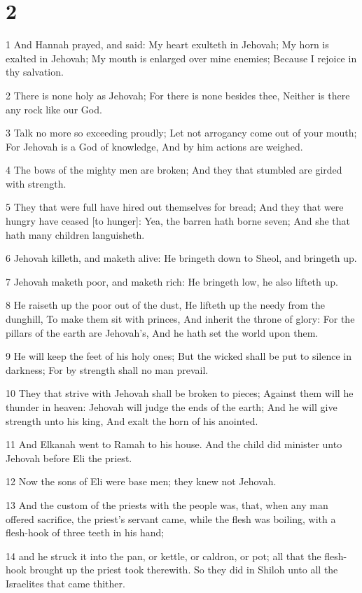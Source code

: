 \chapter{2}

\par 1 And Hannah prayed, and said: My heart exulteth in Jehovah; My horn is exalted in Jehovah; My mouth is enlarged over mine enemies; Because I rejoice in thy salvation.
\par 2 There is none holy as Jehovah; For there is none besides thee, Neither is there any rock like our God.
\par 3 Talk no more so exceeding proudly; Let not arrogancy come out of your mouth; For Jehovah is a God of knowledge, And by him actions are weighed.
\par 4 The bows of the mighty men are broken; And they that stumbled are girded with strength.
\par 5 They that were full have hired out themselves for bread; And they that were hungry have ceased [to hunger]: Yea, the barren hath borne seven; And she that hath many children languisheth.
\par 6 Jehovah killeth, and maketh alive: He bringeth down to Sheol, and bringeth up.
\par 7 Jehovah maketh poor, and maketh rich: He bringeth low, he also lifteth up.
\par 8 He raiseth up the poor out of the dust, He lifteth up the needy from the dunghill, To make them sit with princes, And inherit the throne of glory: For the pillars of the earth are Jehovah's, And he hath set the world upon them.
\par 9 He will keep the feet of his holy ones; But the wicked shall be put to silence in darkness; For by strength shall no man prevail.
\par 10 They that strive with Jehovah shall be broken to pieces; Against them will he thunder in heaven: Jehovah will judge the ends of the earth; And he will give strength unto his king, And exalt the horn of his anointed.
\par 11 And Elkanah went to Ramah to his house. And the child did minister unto Jehovah before Eli the priest.
\par 12 Now the sons of Eli were base men; they knew not Jehovah.
\par 13 And the custom of the priests with the people was, that, when any man offered sacrifice, the priest's servant came, while the flesh was boiling, with a flesh-hook of three teeth in his hand;
\par 14 and he struck it into the pan, or kettle, or caldron, or pot; all that the flesh-hook brought up the priest took therewith. So they did in Shiloh unto all the Israelites that came thither.
